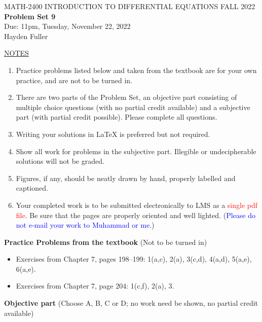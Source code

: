\documentclass{article}
\begin{document}
\begin{center}
\large{ MATH-2400 \hspace{.27in}  INTRODUCTION TO DIFFERENTIAL EQUATIONS \hspace{.27in}FALL 2022\bigskip\\ {\bf Problem Set 9} \smallskip\\ Due: 11pm, Tuesday, November 22, 2022}
\\Hayden Fuller
\end{center}

\bigskip\noindent
\underline{NOTES}
\begin{enumerate}
\item Practice problems listed below and taken from the textbook are for your own practice, and are not to be turned in.
\item There are two parts of the Problem Set, an objective part consisting of multiple choice questions (with no partial credit available) and a subjective part (with partial credit possible).  Please complete all questions.
\item Writing your solutions in {\LaTeX} is preferred but not required.
\item Show all work for problems in the subjective part.  Illegible or undecipherable solutions will not be graded. 
\item Figures, if any, should be neatly drawn by hand, properly labelled and captioned.  
\item Your completed work is to be submitted electronically to LMS  as a \textcolor{red}{single pdf file}. Be sure that the pages are properly oriented and well lighted.  (\textcolor{blue}{Please do not e-mail your work to Muhammad or me.})
\end{enumerate}

\bigskip\noindent
{\bf Practice Problems from the textbook} (Not to be turned in)
\begin{itemize}
\item
Exercises from Chapter 7, pages 198--199: 1(a,c), 2(a), 3(c,d), 4(a,d), 5(a,e), 6(a,e).
\item
Exercises from Chapter 7, page 204: 1(c,f), 2(a), 3.
\end{itemize}

\bigskip\noindent
{\bf Objective part} (Choose A, B, C or D; no work need be shown, no partial credit available)
\end{document}

